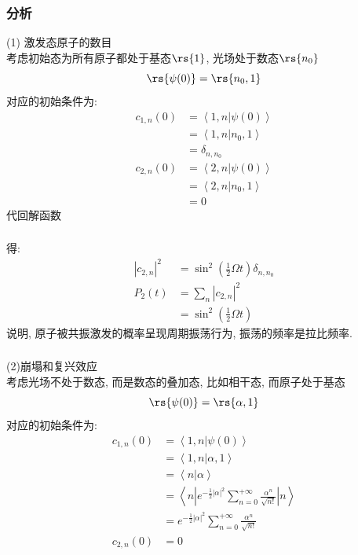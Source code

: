     \begin{frame} 
    \frametitle{分析}
        (1) 激发态原子的数目 \\ 
        {\Bullet}考虑初始态为所有原子都处于基态$\rs{1}$, 光场处于数态$\rs{n_0}$
        \[ \rs{\psi(0)} = \rs{n_0, 1}\]
        对应的初始条件为:
    \[\begin{aligned}
        c_{1,n}(0) &= \left\langle 1,n|\psi(0)\right\rangle \\  
        &=  \left\langle 1,n| n_0, 1\right\rangle\\ 
        &= \delta_{n,n_0} \\ 
        c_{2,n}(0) &= \left\langle 2,n|\psi(0)\right\rangle \\  
        &=  \left\langle 2,n| n_0, 1\right\rangle\\ 
        &= 0
    \end{aligned} \]
    代回解函数
    \end{frame}

    \begin{frame} 
    \frametitle{}
    得:
    \[\begin{aligned}
             \left|c_{2,n}\right|^2 &= \sin^2 (\frac{1}{2}\Omega t) \delta_{n,n_0} \\ 
             P_2(t) &= \sum_n \left|c_{2, n}\right|^2  \\ 
             &= \sin ^2 (\frac{1}{2}\Omega t) 
    \end{aligned} \]
    说明, 原子被共振激发的概率呈现周期振荡行为, 振荡的频率是拉比频率.  \\ 
    \end{frame}

    \begin{frame} 
    \frametitle{}
    (2)崩塌和复兴效应 \\
    {\Bullet}考虑光场不处于数态, 而是数态的叠加态, 比如相干态, 而原子处于基态
    \[ \rs{\psi(0)} = \rs{\alpha, 1}\] 
    对应的初始条件为:
    \[\begin{aligned}
        c_{1,n}(0) &= \left\langle 1,n|\psi(0)\right\rangle \\  
        &=  \left\langle 1,n| \alpha, 1\right\rangle\\ 
        &= \left\langle n| \alpha \right\rangle \\
        &= \left\langle n \left| e^{-\frac{1}{2}|\alpha|^2}  \sum_{n=0} ^{+\infty}  \frac{\alpha^n}{\sqrt{n!}} \right| n \right\rangle\\ 
        &= e^{-\frac{1}{2}|\alpha|^2} \sum_{n=0} ^{+\infty}  \frac{\alpha^n}{\sqrt{n!}} \\
        c_{2,n}(0) &= 0
    \end{aligned} \]
    \end{frame}

